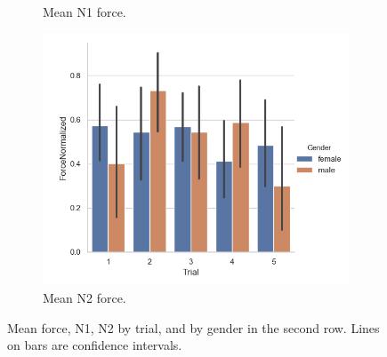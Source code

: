 \begin{figure}[H]
\begin{subfigure}[b]{0.3\textwidth}
         \caption{Mean N1 force.}
     \label{fig:forceN1TrialGen}
     \end{subfigure}
     \hspace{7mm}
      \begin{subfigure}[b]{0.3\textwidth}
         \centering
     \includegraphics[scale=0.4]{Files/Plots/forceNormalized_mean_by_trial_gen.png}
         \caption{Mean N2 force.}
     \label{fig:forceN2TrialGen}
     \end{subfigure}
     \caption{Mean force, N1, N2  by trial, and by gender in the second row. Lines on bars are confidence intervals.}
     \label{fig:allForceTrial}
\end{figure} 


